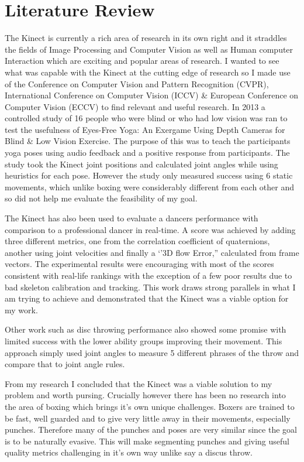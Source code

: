 \section{Literature Review}
The Kinect is currently a rich area of research in its own right and it straddles the fields of Image Processing and Computer Vision as well as Human computer Interaction which are exciting and popular areas of research. I wanted to see what was capable with the Kinect at the cutting edge of research so I made use of the Conference on Computer Vision and Pattern Recognition (CVPR), International Conference on Computer Vision (ICCV) \& European Conference on Computer Vision (ECCV) to find relevant and useful research.\newline 
In 2013 a controlled study of 16 people who were blind or who had low vision was ran to test the usefulness of Eyes-Free Yoga: An Exergame Using Depth Cameras for Blind \& Low Vision Exercise. The purpose of this was to teach the participants yoga poses using audio feedback and a positive response from participants.\cite{Rector2013} The study took the Kinect joint positions and calculated joint angles while using heuristics for each pose. However the study only measured success using 6 static movements, which unlike boxing were considerably different from each other and so did not help me evaluate the feasibility of my goal.

The Kinect has also been used to evaluate a dancers performance with comparison to a professional dancer in real-time\cite{Alexiadis2011}. A score was achieved by adding three different metrics, one from the correlation coefficient of quaternions, another using joint velocities and finally a `'3D flow Error,'' calculated from frame vectors.\newline
The experimental results were encouraging with most of the scores consistent with real-life rankings with the exception of a few poor results due to bad skeleton calibration and tracking. This work draws strong parallels in what I am trying to achieve and demonstrated that the Kinect was a viable option for my work.

Other work such as disc throwing performance\cite{Yamaoka2013} also showed some promise with limited success with the lower ability groups improving their movement. This approach simply used joint angles to measure 5 different phrases of the throw and compare that to joint angle rules.
\newline

From my research I concluded that the Kinect was a viable solution to my problem and worth pursing. Crucially however there has been no research into the area of boxing which brings it's own unique challenges. 
Boxers are trained to be fast, well guarded and to give very little away in their movements, especially punches. Therefore many of the punches and poses are very similar since the goal is to be naturally evasive. This will make segmenting punches and giving useful quality metrics challenging in it's own way unlike say a discus throw.

